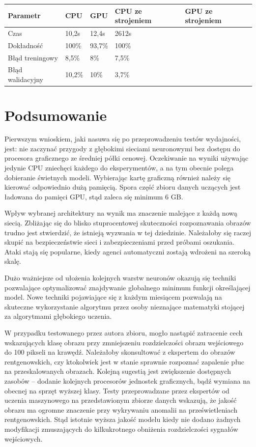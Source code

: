 \documentclass[12pt,a4paper,twoside,titlepage,openright]{book}
\begin{document}
\begin{center}
    \begin{tabular}{ | l | l | l | l | l |}
    \hline
    Parametr & CPU & GPU & CPU ze strojeniem & GPU ze strojeniem \\ \hline
    Czas & 10,2s & 12,4s & 2612s &  \\ \hline
    Dokładność & 100\% & 93,7\% & 100\% & \\ \hline
    Błąd treningowy & 8,5\% & 8\% & 7,5\% &  \\ \hline
    Błąd walidacyjny & 10,2\% & 10\% & 3,7\% &  \\ \hline
    \end{tabular}
\end{center}

\section{Podsumowanie}
Pierwszym wnioskiem, jaki nasuwa się po przeprowadzeniu testów wydajności, jest: nie zaczynać przygody z głębokimi sieciami neuronowymi bez dostępu do procesora graficznego ze średniej półki cenowej. Oczekiwanie na wyniki używając jedynie CPU zniechęci każdego do eksperymentów, a na tym obecnie polega dobieranie świetnych modeli. Wybierając kartę graficzną również należy się kierować odpowiednio dużą pamięcią. Spora część zbioru danych uczących jest ładowana do pamięci GPU, stąd zaleca się minimum 6 GB.

Wpływ wybranej architektury na wynik ma znaczenie malejące z każdą nową siecią. Zbliżając się do blisko stuprocentowej skuteczności rozpoznawania obrazów trudno jest stwierdzić, że istnieją wyzwania w tej dziedzinie. Należałoby się raczej skupić na bezpieczeństwie sieci i zabezpieczeniami przed próbami oszukania. Ataki stają się popularne, kiedy agenci automatyczni zostają wdrożeni na szeroką skalę.

Dużo ważniejsze od ułożenia kolejnych warstw neuronów okazują się techniki pozwalające optymalizować znajdywanie globalnego minimum funkcji określającej model. Nowe techniki pojawiające się z każdym miesiącem pozwalają na skuteczne wykorzystanie algorytmu przez osoby nieznające matematyki stojącej za algorytmami głębokiego uczenia.

W przypadku testowanego przez autora zbioru, mogło nastąpić zatracenie cech wskazujących klasę obrazu przy zmniejszeniu rozdzielczości obrazu wejściowego do 100 pikseli na krawędź. Należałoby skonsultować z ekspertem do obrazów rentgenowskich, czy ktokolwiek jest w stanie sprawnie rozpoznać zapalenie płuc na przeskalowanych obrazach. Kolejną sugestią jest zwiększenie dostępnych zasobów -- dodanie kolejnych procesorów jednostek graficznych, bądź wymiana na obecnej na sprzęt wyższej klasy. Testy przeprowadzane przez ekspertów od uczenia maszynowego na przedstawionym zbiorze danych wskazują, że jakość obrazu ma ogromne znaczenie przy wykrywaniu anomalii na prześwietleniach rentgenowskich. Stąd istotnie wyższa jakość modelu kiedy nie dodano żadnych modyfikacji zmuszających do kilkukrotnego obniżenia rozdzielczości sygnałów wejściowych.
\end{document}
